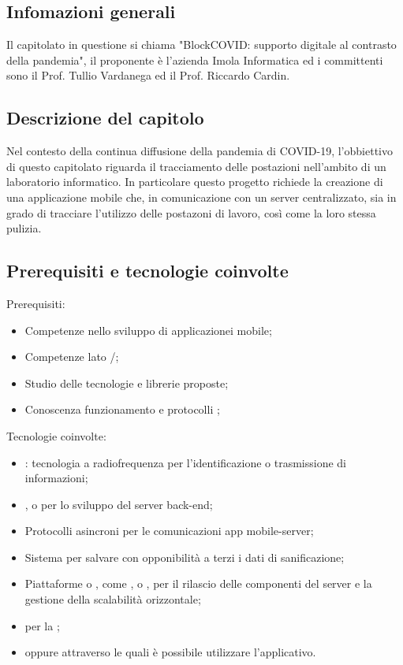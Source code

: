 
\subsection{Infomazioni generali}
Il capitolato in questione si chiama "BlockCOVID: supporto digitale al contrasto della pandemia", il proponente è l'azienda Imola Informatica ed i committenti sono il Prof. Tullio Vardanega ed il Prof. Riccardo Cardin.

\subsection{Descrizione del capitolo}
Nel contesto della continua diffusione della pandemia di COVID-19, l'obbiettivo di questo capitolato riguarda il tracciamento delle postazioni nell'ambito di un laboratorio informatico. In particolare questo progetto richiede la creazione di una applicazione mobile che, in comunicazione con un server centralizzato, sia in grado di tracciare l'utilizzo delle postazoni di lavoro, così come la loro stessa pulizia.

\subsection{Prerequisiti e tecnologie coinvolte}
Prerequisiti:
\begin{itemize}
\item Competenze nello sviluppo di applicazionei mobile;
\item Competenze lato /;
\item Studio delle tecnologie e librerie proposte;
\item Conoscenza funzionamento e protocolli ;
\end{itemize}

Tecnologie coinvolte:
\begin{itemize}
\item {}: tecnologia a radiofrequenza per l'identificazione o trasmissione di informazioni;
\item {},  o  per lo sviluppo del server back-end;
\item Protocolli asincroni per le comunicazioni app mobile-server;
\item Sistema  per salvare con opponibilità a terzi i dati di sanificazione;
\item Piattaforme  o , come ,  o , per il rilascio delle componenti del server e la gestione della scalabilità orizzontale;
\item {} per la ;
\item {} oppure  attraverso le quali è possibile utilizzare l'applicativo.
\end{itemize}


